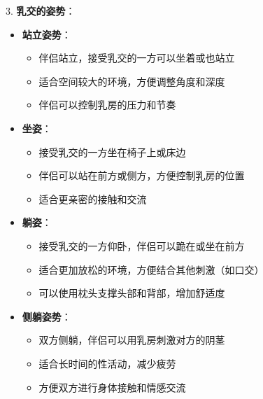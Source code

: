 \documentclass[12pt,UTF8]{ctexbook}
\begin{document}
3. \textbf{乳交的姿势}：
\begin{itemize}
	\item \textbf{站立姿势}：
	\begin{itemize}
		\item 伴侣站立，接受乳交的一方可以坐着或也站立
		\item 适合空间较大的环境，方便调整角度和深度
		\item 伴侣可以控制乳房的压力和节奏
	\end{itemize}
	\item \textbf{坐姿}：
	\begin{itemize}
		\item 接受乳交的一方坐在椅子上或床边
		\item 伴侣可以站在前方或侧方，方便控制乳房的位置
		\item 适合更亲密的接触和交流
	\end{itemize}
	\item \textbf{躺姿}：
	\begin{itemize}
		\item 接受乳交的一方仰卧，伴侣可以跪在或坐在前方
		\item 适合更加放松的环境，方便结合其他刺激（如口交）
		\item 可以使用枕头支撑头部和背部，增加舒适度
	\end{itemize}
	\item \textbf{侧躺姿势}：
	\begin{itemize}
		\item 双方侧躺，伴侣可以用乳房刺激对方的阴茎
		\item 适合长时间的性活动，减少疲劳
		\item 方便双方进行身体接触和情感交流
	\end{itemize}
\end{itemize}
\end{document}
